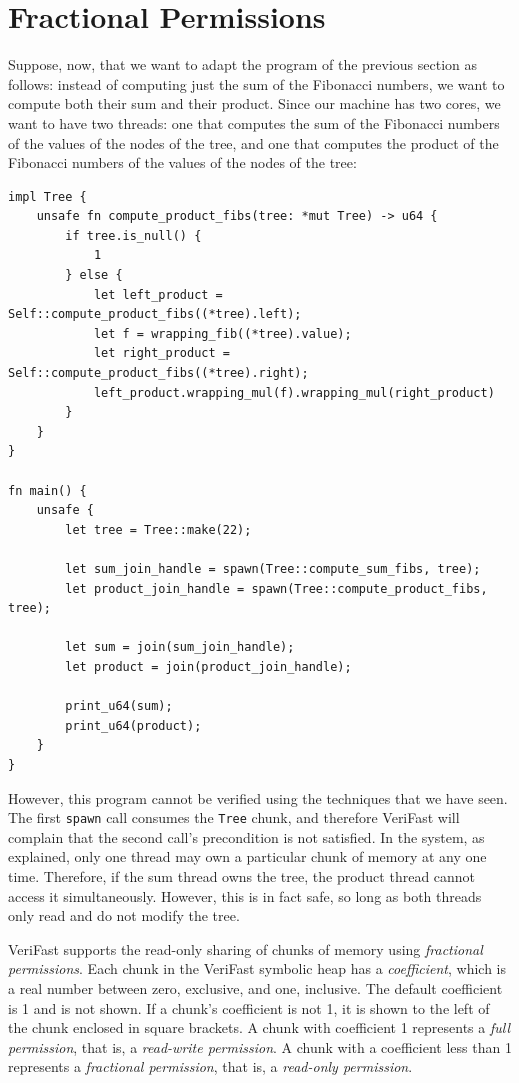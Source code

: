 \documentclass{article}
\begin{document}
\section{Fractional Permissions}\label{section:fractions}

Suppose, now, that we want to adapt the program of the previous
section as follows: instead of computing just the sum of the
Fibonacci numbers, we want to compute both their sum and
their product. Since our machine has two cores,
we want to have two threads: one that computes the sum of the
Fibonacci numbers of the values of the nodes of the tree, and one that
computes the product of the Fibonacci numbers of the values of the
nodes of the tree:
\begin{lstlisting}
impl Tree {
    unsafe fn compute_product_fibs(tree: *mut Tree) -> u64 {
        if tree.is_null() {
            1
        } else {
            let left_product = Self::compute_product_fibs((*tree).left);
            let f = wrapping_fib((*tree).value);
            let right_product = Self::compute_product_fibs((*tree).right);
            left_product.wrapping_mul(f).wrapping_mul(right_product)
        }
    }
}

fn main() {
    unsafe {
        let tree = Tree::make(22);
        
        let sum_join_handle = spawn(Tree::compute_sum_fibs, tree);
        let product_join_handle = spawn(Tree::compute_product_fibs, tree);
        
        let sum = join(sum_join_handle);
        let product = join(product_join_handle);
        
        print_u64(sum);
        print_u64(product);
    }
}
\end{lstlisting}

However, this program cannot be verified using the techniques
that we have seen. The first \lstinline!spawn! call
consumes the \lstinline!Tree! chunk, and therefore VeriFast
will complain that the second call's precondition is not
satisfied. In the system, as explained, only one thread may own
a particular chunk of memory at any one time. Therefore, if the
sum thread owns the tree, the product thread cannot access it
simultaneously. However, this is in fact safe, so long as both
threads only read and do not modify the tree.

VeriFast supports the read-only sharing of chunks of memory
using \emph{fractional permissions}. Each chunk in the VeriFast
symbolic heap has a \emph{coefficient}, which is a real number
between zero, exclusive, and one, inclusive. The default
coefficient is 1 and is not shown. If a chunk's coefficient is
not 1, it is shown to the left of the chunk enclosed in square
brackets. A chunk with coefficient 1 represents a \emph{full
permission}, that is, a \emph{read-write permission}. A chunk
with a coefficient less than 1 represents a \emph{fractional
permission}, that is, a \emph{read-only permission}.
\end{document}
